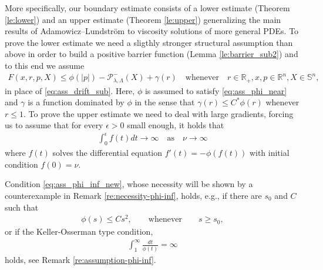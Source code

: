 \documentclass[12pt]{article}
\numberwithin{komcounter}{section}
\begin{document}
More specifically, our boundary estimate consists of a lower estimate (Theorem \ref{le:lower}) and an upper estimate (Theorem \ref{le:upper}) generalizing the main results of Adamowicz--Lundstr\"om \cite{AL16} to viscosity solutions of more general PDEs.
To prove the lower estimate we need a sligthly stronger structural assumption than above in order to build a positive barrier function (Lemma \ref{le:barrier_sub2}) and to this end we assume
%
\begin{align} \label{eq:ass_drift_sub_ast}
F(x,r,p,X) \leq \phi(|p|)  - \mathcal{P}^-_{\lambda,\Lambda}(X) + \gamma(r) \quad \text{whenever} \quad r \in \mathbb{R}_+, %
x, p \in \mathbb{R}^n, X \in \mathbb{S}^n,
\tag{$F_2 B^\ast$}
\end{align}
in place of \eqref{eq:ass_drift_sub}. Here, $\phi$ is assumed to satisfy \eqref{eq:ass_phi_near} and $\gamma$ is a function dominated by $\phi$ in the sense that $\gamma(r) \leq C^\ast \phi(r)$ whenever $r \leq 1$.
To prove the upper estimate we need to deal with large gradients, forcing us to assume
that for every $\epsilon > 0$  small enough, it holds that
%
\begin{align}\label{eq:ass_phi_inf_new}
 \int_{0}^{\epsilon} f(t) dt \to \infty  \quad\text{as} \quad \nu \to \infty \tag{$\phi_B$}
\end{align}
%
where $f(t)$ solves the differential equation $f'(t) = - \phi(f(t))$ with initial condition $f(0) = \nu$.
%


Condition \eqref{eq:ass_phi_inf_new},
whose necessity will be shown by a counterexample in Remark \ref{re:necessity-phi-inf},
holds, e.g., if there are $s_0$ and $C$ such that
%
\begin{align}\label{eq:ass_Cs^2}
\phi(s) \leq C s^2, \qquad \text{whenever} \qquad s \geq s_0,
\end{align}
%
or if the Keller-Osserman type condition,
%
\begin{align}\label{eq:ass_phi_inf}
\int_{1}^{\infty} \frac{dt}{\phi(t)} = \infty
\end{align}
%
holds, see Remark \ref{re:assumption-phi-inf}.
\end{document}
